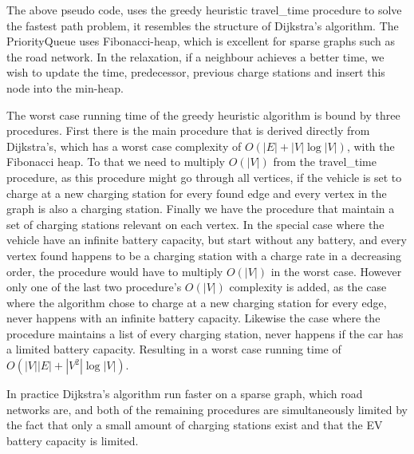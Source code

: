 The above pseudo code, uses the greedy heuristic travel\_time procedure to solve the fastest path problem, it resembles the structure of Dijkstra's algorithm. The PriorityQueue uses Fibonacci-heap, which is excellent for sparse graphs such as the road network. In the relaxation, if a neighbour achieves a better time, we wish to update the time, predecessor, previous charge stations and insert this node into the min-heap.


The worst case running time of the greedy heuristic algorithm is bound by three procedures. First there is the main procedure that is derived directly from Dijkstra's, which has a worst case complexity of $O(|E|+|V|\log|V|)$, with the Fibonacci heap. To that we need to multiply $O(|V|)$ from the travel\_time procedure, as this procedure might go through all vertices, if the vehicle is set to charge at a new charging station for every found edge and every vertex in the graph is also a charging station. Finally we have the procedure that maintain a set of charging stations relevant on each vertex. In the special case where the vehicle have an infinite battery capacity, but start without any battery, and every vertex found happens to be a charging station with a charge rate in a decreasing order, the procedure would have to multiply $O(|V|)$ in the worst case.
However only one of the last two procedure's $O(|V|)$ complexity is added, as the case where the algorithm chose to charge at a new charging station for every edge, never happens with an infinite battery capacity. Likewise the case where the procedure maintains a list of every charging station, never happens if the car has a limited battery capacity. Resulting in a worst case running time of $O(|V||E|+|V^2|\log|V|)$. %


In practice Dijkstra's algorithm run faster on a sparse graph, which road networks are, and both of the remaining procedures are simultaneously limited by the fact that only a small amount of charging stations exist and that the EV battery capacity is limited.